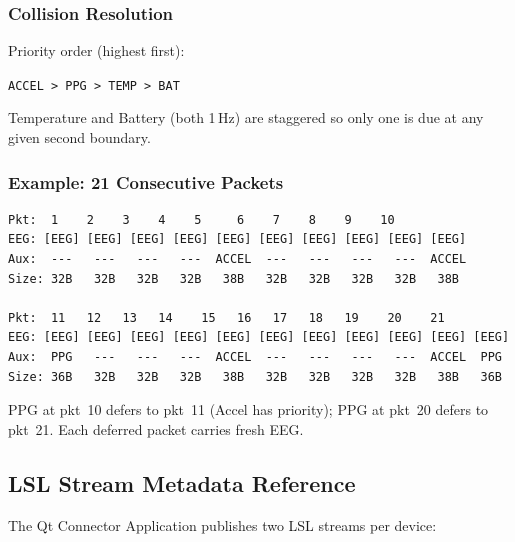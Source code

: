 \documentclass[11pt,a4paper]{article}
\begin{document}
\subsubsection{Collision Resolution}

Priority order (highest first):

\begin{center}
\texttt{ACCEL > PPG > TEMP > BAT}
\end{center}

\noindent Temperature and Battery (both 1\,Hz) are staggered so only one
is due at any given second boundary.

\subsubsection{Example: 21 Consecutive Packets}

\begin{lstlisting}[caption={Scheduling over 21 samples (Accel every 5th, PPG every 10th)}]
Pkt:  1    2    3    4    5     6    7    8    9    10
EEG: [EEG] [EEG] [EEG] [EEG] [EEG] [EEG] [EEG] [EEG] [EEG] [EEG]
Aux:  ---   ---   ---   ---  ACCEL  ---   ---   ---   ---  ACCEL
Size: 32B   32B   32B   32B   38B   32B   32B   32B   32B   38B

Pkt:  11   12   13   14    15   16   17   18   19    20    21
EEG: [EEG] [EEG] [EEG] [EEG] [EEG] [EEG] [EEG] [EEG] [EEG] [EEG] [EEG]
Aux:  PPG   ---   ---   ---  ACCEL  ---   ---   ---   ---  ACCEL  PPG
Size: 36B   32B   32B   32B   38B   32B   32B   32B   32B   38B   36B
\end{lstlisting}

\noindent PPG at pkt~10 defers to pkt~11 (Accel has priority); PPG at
pkt~20 defers to pkt~21.  Each deferred packet carries fresh EEG.
\fi

\subsection{LSL Stream Metadata Reference}

The Qt Connector Application publishes two LSL streams per device:
\end{document}
